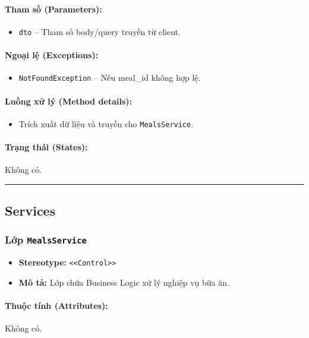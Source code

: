 \documentclass[12pt,a4paper]{article}
\begin{document}
\paragraph{Tham số (Parameters):}
\begin{itemize}[leftmargin=*]
    \item \texttt{dto} – Tham số body/query truyền từ client.
\end{itemize}


\paragraph{Ngoại lệ (Exceptions):}
\begin{itemize}[leftmargin=*]
    \item \texttt{NotFoundException} – Nếu meal\_id không hợp lệ.
\end{itemize}


\paragraph{Luồng xử lý (Method details):}
\begin{itemize}[leftmargin=*]
    \item Trích xuất dữ liệu và truyền cho \texttt{MealsService}.
\end{itemize}


\paragraph{Trạng thái (States):}
Không có.

\vskip 0.5cm
\noindent\rule{\textwidth}{0.5pt}
\vskip 0.5cm

\subsection{Services}

\subsubsection{Lớp \texttt{MealsService}}
\begin{itemize}[leftmargin=*]
    \item \textbf{Stereotype:} \texttt{\textless{}\textless{}Control\textgreater{}\textgreater{}}
    \item \textbf{Mô tả:} Lớp chứa Business Logic xử lý nghiệp vụ bữa ăn.
\end{itemize}

\paragraph{Thuộc tính (Attributes):}
Không có.
\end{document}
